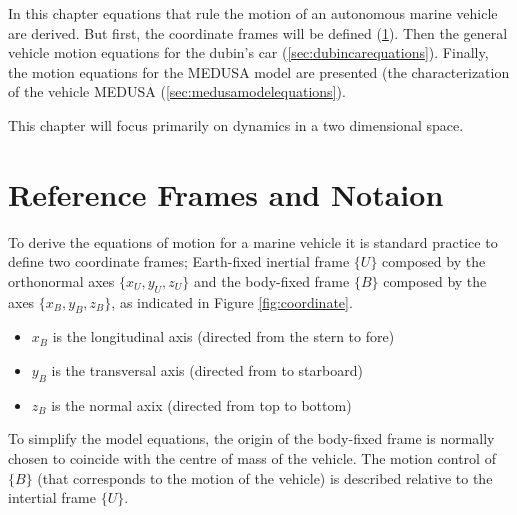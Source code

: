 \cleardoublepage
\label{chap:autonomousvehiclemodels}

\par In this chapter equations that rule the motion of an autonomous marine vehicle are derived. But first, the coordinate frames will be defined (\ref{sec:refframes}). Then the general vehicle motion equations for the dubin's car (\ref{sec:dubincarequations}). Finally, the motion equations for the MEDUSA model are presented (the characterization of the vehicle MEDUSA (\ref{sec:medusamodelequations}). 
\par This chapter will focus primarily on dynamics in a two dimensional space.


\section{Reference Frames and Notaion}
\label{sec:refframes}


\par To derive the equations of motion for a marine vehicle it is standard practice to define two coordinate frames; Earth-fixed inertial frame $\{U\}$ composed by the orthonormal axes $\{x_U,y_U,z_U\}$ and the body-fixed frame $\{B\}$ composed by the axes $\{x_B,y_B,z_B\}$, as indicated in Figure \ref{fig:coordinate}.

\begin{itemize}
    \item $x_B$ is the longitudinal axis (directed from the stern to fore)
    \item $y_B$ is the transversal axis (directed from to starboard)
    \item $z_B$ is the normal axix (directed from top to bottom)
\end{itemize}

\par To simplify the model equations, the origin of the body-fixed frame is normally chosen to coincide with the centre of mass of the vehicle. The motion control of $\{B\}$ (that corresponds to the motion of the vehicle) is described relative to the intertial frame $\{U\}$.

